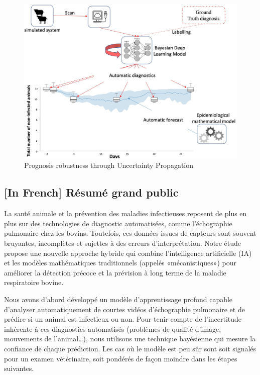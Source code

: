 \begin{enumerate}
    \begin{figure}[H]
      \includegraphics[width=\linewidth]{figures/chap4/method 3.jpg}
      \caption{Prognosis robustness through Uncertainty Propagation}
      \label{fig:chap4-method3}
    \end{figure}
    
\end{enumerate}

 
\subsection{[In French] Résumé grand public} 

La santé animale et la prévention des maladies infectieuses reposent de plus en plus sur des technologies de diagnostic automatisées, comme l’échographie pulmonaire chez les bovins. Toutefois, ces données issues de capteurs sont souvent bruyantes, incomplètes et sujettes à des erreurs d’interprétation. Notre étude propose une nouvelle approche hybride qui combine l’intelligence artificielle (IA) et les modèles mathématiques traditionnels (appelés «mécanistiques») pour améliorer la détection précoce et la prévision à long terme de la maladie respiratoire bovine.

Nous avons d’abord développé un modèle d’apprentissage profond capable d’analyser automatiquement de courtes vidéos d’échographie pulmonaire et de prédire si un animal est infectieux ou non. Pour tenir compte de l’incertitude inhérente à ces diagnostics automatisés (problèmes de qualité d’image, mouvements de l’animal…), nous utilisons une technique bayésienne qui mesure la confiance de chaque prédiction. Les cas où le modèle est peu sûr sont soit signalés pour un examen vétérinaire, soit pondérés de façon moindre dans les étapes suivantes.

